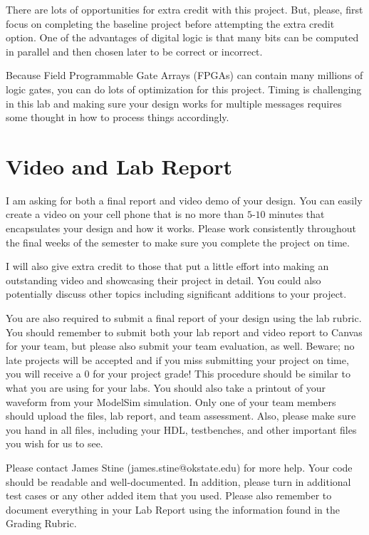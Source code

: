 \documentclass{article}
\begin{document}
There are lots of opportunities for extra credit with this project.
But, please, first focus on completing the baseline project before
attempting the extra credit option.  One of the advantages of digital
logic is that many bits can be computed in parallel and then chosen
later to be correct or incorrect.

Because Field Programmable Gate Arrays
(FPGAs) can contain many millions of logic gates, you can do lots of
optimization for this project.  Timing is challenging in this lab and
making sure your design works for multiple messages requires some
thought in how to process things accordingly.

\section{Video and Lab Report}

I am asking for
both a final report and video demo of your design.  You can easily
create a video on your cell phone that is no more than $5$-$10$ minutes
that encapsulates your design and how it works.  Please work
consistently throughout the final weeks of the semester to make sure
you complete the project on time.

I will also give extra credit to those that put a little effort into
making an outstanding video and showcasing their project in detail.
You could also potentially discuss other topics including significant
additions to your project.

You are also required to submit a final report of your design using
the lab rubric.  You should remember to submit both your lab report
and video report to Canvas for
your team, but please also submit your team evaluation, as well.
Beware; no
late projects will be accepted and if you miss submitting your project
on time, you will receive a $0$ for your project grade!  This
procedure should be similar to what you are using for your labs.
You should also take a printout of your waveform 
from your ModelSim simulation.  
Only one of your team members should upload
the files, lab report, and team assessment.  Also, please make sure you
hand in all files, including your HDL, testbenches, and other
important files you wish for us to see.

Please contact James Stine (james.stine@okstate.edu) 
for more help.  Your code should be
readable and well-documented. In addition, please turn in additional
test cases or any other added item that you used. 
Please also remember to document everything in your Lab Report using
the information found in the Grading Rubric.

   


\end{document}
